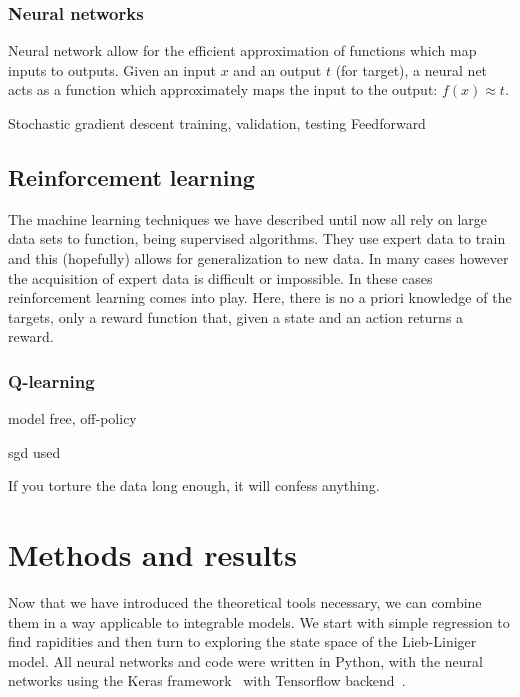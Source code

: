 \documentclass[11pt, a4paper]{report} %
\begin{document}
\subsection{Neural networks}
Neural network allow for the efficient approximation of functions which map inputs to outputs.
Given an input \(x\) and an output \(t\) (for target), a neural net acts as a function which approximately maps the input to the output: \(f(x)\approx t\).

Stochastic gradient descent
training, validation, testing
Feedforward
\cite{Bishop2006}

\section{Reinforcement learning}

The machine learning techniques we have described until now all rely on large data sets to function, being supervised algorithms.
They use expert data to train and this (hopefully) allows for generalization to new data.
In many cases however the acquisition of expert data is difficult or impossible.
In these cases reinforcement learning comes into play.
Here, there is no a priori knowledge of the targets, only a reward function that, given a state and an action returns a reward.

\subsection{Q-learning}

model free, off-policy

sgd used~\cite{mnih13_playin_atari_with_deep_reinf_learn}




\cite{Sutton}

\begin{savequote}[50mm]
If you torture the data long enough, it will confess anything.
\end{savequote}


\chapter{Methods and results}\label{chap:results}

\noindent

Now that we have introduced the theoretical tools necessary, we can combine them in a way applicable to integrable models.
We start with simple regression to find rapidities and then turn to exploring the state space of the Lieb-Liniger model.
All neural networks and code were written in Python, with the neural networks using the Keras framework~\cite{chollet2015keras} with Tensorflow backend~\cite{tensorflow2015-whitepaper}.
\end{document}
